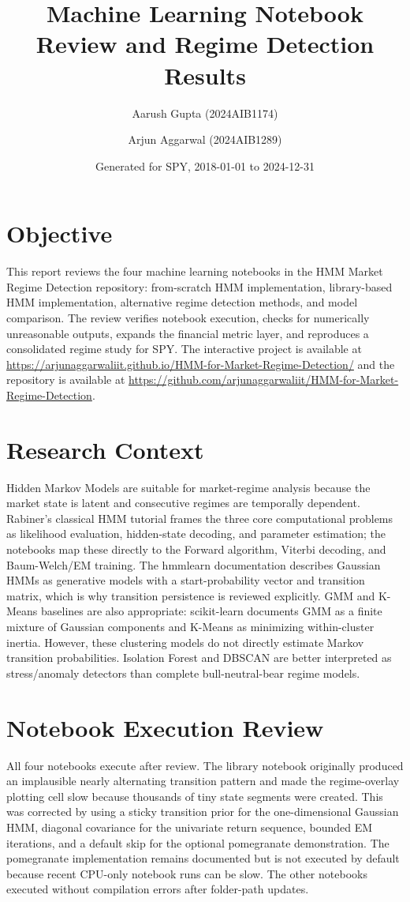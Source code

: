 \documentclass[12pt,a4paper]{article}
\title{Machine Learning Notebook Review and Regime Detection Results}
\author{Aarush Gupta (2024AIB1174) \and Arjun Aggarwal (2024AIB1289)}
\date{Generated for SPY, 2018-01-01 to 2024-12-31}
\begin{document}
\maketitle

\section{Objective}
This report reviews the four machine learning notebooks in the HMM Market Regime Detection repository: from-scratch HMM implementation, library-based HMM implementation, alternative regime detection methods, and model comparison. The review verifies notebook execution, checks for numerically unreasonable outputs, expands the financial metric layer, and reproduces a consolidated regime study for SPY. The interactive project is available at \url{https://arjunaggarwaliit.github.io/HMM-for-Market-Regime-Detection/} and the repository is available at \url{https://github.com/arjunaggarwaliit/HMM-for-Market-Regime-Detection}.

\section{Research Context}
Hidden Markov Models are suitable for market-regime analysis because the market state is latent and consecutive regimes are temporally dependent. Rabiner's classical HMM tutorial frames the three core computational problems as likelihood evaluation, hidden-state decoding, and parameter estimation; the notebooks map these directly to the Forward algorithm, Viterbi decoding, and Baum-Welch/EM training. The hmmlearn documentation describes Gaussian HMMs as generative models with a start-probability vector and transition matrix, which is why transition persistence is reviewed explicitly. GMM and K-Means baselines are also appropriate: scikit-learn documents GMM as a finite mixture of Gaussian components and K-Means as minimizing within-cluster inertia. However, these clustering models do not directly estimate Markov transition probabilities. Isolation Forest and DBSCAN are better interpreted as stress/anomaly detectors than complete bull-neutral-bear regime models.

\section{Notebook Execution Review}
All four notebooks execute after review. The library notebook originally produced an implausible nearly alternating transition pattern and made the regime-overlay plotting cell slow because thousands of tiny state segments were created. This was corrected by using a sticky transition prior for the one-dimensional Gaussian HMM, diagonal covariance for the univariate return sequence, bounded EM iterations, and a default skip for the optional pomegranate demonstration. The pomegranate implementation remains documented but is not executed by default because recent CPU-only notebook runs can be slow. The other notebooks executed without compilation errors after folder-path updates.
\end{document}
